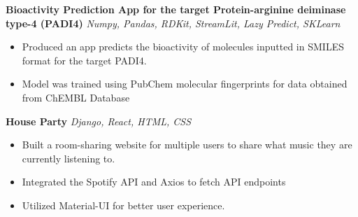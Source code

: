 \documentclass[a4paper]{article}
\begin{document}
{\textbf{Bioactivity Prediction App for the target Protein-arginine deiminase type-4 (PADI4)}} {\sl Numpy, Pandas, RDKit, StreamLit, Lazy Predict, SKLearn} \\
\vspace{-1mm}
\begin{itemize} \itemsep 1pt
	\item Produced an app predicts the bioactivity of molecules inputted in SMILES format for the target PADI4.
	\item Model was trained using PubChem molecular fingerprints for data obtained from ChEMBL Database
\end{itemize}
\vspace*{1mm}

{\textbf{House Party}} {\sl Django, React, HTML, CSS} \\
\vspace{-1mm}
\begin{itemize} \itemsep 1pt
	\item Built a room-sharing website for multiple users to share what music they are currently listening to.
	\item Integrated the Spotify API and Axios to fetch API endpoints
        \item Utilized Material-UI for better user experience.\\
\end{itemize}
\vspace*{1mm}
\end{document}
